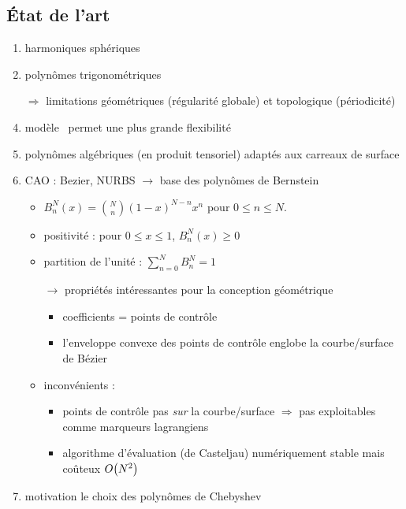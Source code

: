 \subsection{État de l'art}
\begin{enumerate}
	\item harmoniques sphériques \cite{rahimian2015}
	\item polynômes trigonométriques \cite{gueyffier2015}
	\item[$\Rightarrow$] limitations géométriques (régularité globale) et topologique (périodicité)
	\item modèle \brep\ permet une plus grande flexibilité
	\item polynômes algébriques (en produit tensoriel) adaptés aux carreaux de surface
	\item CAO : Bezier, NURBS $\to$ base des polynômes de Bernstein
	\begin{itemize}
		\item $B_n^N(x) = \binom{N}{n} \left( 1 - x \right)^{N-n} x^n$ pour $0 \leq n \leq N$.
		\item positivité : pour $0 \leq x \leq 1$, $B_n^N(x) \geq 0$
		\item partition de l'unité : $\sum_{n = 0}^N B_n^N = 1$
		\item[$\to$] propriétés intéressantes pour la conception géométrique
		\begin{itemize}
			\item coefficients = points de contrôle
			\item l'enveloppe convexe des points de contrôle englobe la courbe/surface de Bézier
		\end{itemize}
		\item inconvénients :
		\begin{itemize}
			\item points de contrôle pas \emph{sur} la courbe/surface $\Rightarrow$ pas exploitables comme marqueurs lagrangiens
			\item algorithme d'évaluation (de Casteljau) numériquement stable mais coûteux $O\!\left( {N^2} \right)$
		\end{itemize}
	\end{itemize}
	\item motivation le choix des polynômes de Chebyshev
\end{enumerate}

